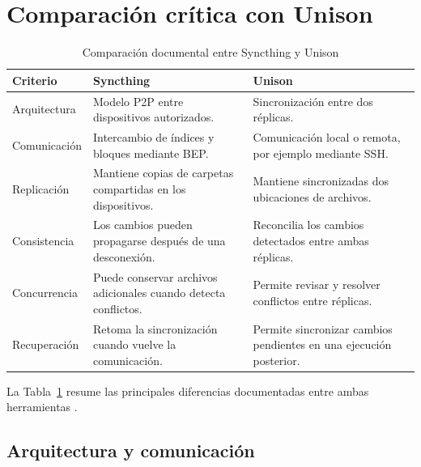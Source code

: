 \documentclass[12pt,a4paper]{article}
\begin{document}
\section{Comparación crítica con Unison}

\begin{table}[H]
\centering
\small
\caption{Comparación documental entre Syncthing y Unison}
\label{tab:syncthing-unison}
\begin{tabular}{p{3cm}p{4.6cm}p{4.6cm}}
\toprule
\textbf{Criterio} & \textbf{Syncthing} & \textbf{Unison} \\
\midrule
Arquitectura &
Modelo P2P entre dispositivos autorizados. &
Sincronización entre dos réplicas. \\

Comunicación &
Intercambio de índices y bloques mediante BEP. &
Comunicación local o remota, por ejemplo mediante SSH. \\

Replicación &
Mantiene copias de carpetas compartidas en los dispositivos. &
Mantiene sincronizadas dos ubicaciones de archivos. \\

Consistencia &
Los cambios pueden propagarse después de una desconexión. &
Reconcilia los cambios detectados entre ambas réplicas. \\

Concurrencia &
Puede conservar archivos adicionales cuando detecta conflictos. &
Permite revisar y resolver conflictos entre réplicas. \\

Recuperación &
Retoma la sincronización cuando vuelve la comunicación. &
Permite sincronizar cambios pendientes en una ejecución posterior. \\
\bottomrule
\end{tabular}
\end{table}

La Tabla~\ref{tab:syncthing-unison} resume las
principales diferencias documentadas entre ambas
herramientas \cite{syncthingBEP,syncthingSyncing,unisonOfficial}.

\subsection{Arquitectura y comunicación}
\end{document}

